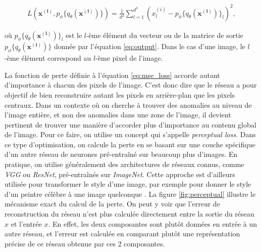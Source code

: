 \begin{gather} \label{eq:mse_loss}
L(\boldsymbol{x^{(i)}}, p_\phi\{q_\theta(\boldsymbol{x^{(i)}})\}) = \frac{1}{d^2} \sum_{l=1}^{d^2} (x^{(i)}_{l} - p_\phi\{q_\theta(\boldsymbol{x^{(i)}})\}_l)^2,
\end{gather}

où $p_\phi\{q_\theta(\boldsymbol{x^{(i)}})\}_l$ est le $l$-ème élément du vecteur ou de la matrice de sortie $p_\phi\{q_\theta(\boldsymbol{x^{(i)}})\}$ donnée par l'équation \ref{eq:output}. Dans le cas d'une image, le $l$-ème élément correspond au $l$-ème  pixel de l'image.

La fonction de perte définie à l'équation \ref{eq:mse_loss} accorde autant d'importance à chacun des pixels de l'image. C'est donc dire que le réseau a pour objectif de bien reconstruire autant les pixels en arrière-plan que les pixels centraux. Dans un contexte où on cherche à trouver des anomalies au niveau de l'image entière, et non des anomalies dans une zone de l'image, il devient pertinent de trouver une manière d'accorder plus d'importance au contenu global de l'image. Pour ce faire, on utilise un concept qui s'appelle \textit{perceptual loss}. Dans ce type d'optimisation, on calcule la perte en se basant sur une couche spécifique d'un autre réseau de neurones pré-entraîné sur beaucoup plus d'images. En pratique, on utilise généralement des architectures de réseaux connus,  comme \textit{VGG} ou \textit{ResNet}, pré-entraînés sur \textit{ImageNet}. Cette approche est d'ailleurs utilisée pour transformer le style d'une image, par exemple pour donner le style d'un peintre célèbre à une image quelconque \citep{Johnson2016Perceptual}. La figure \ref{fig:perceptual} illustre le mécanisme exact du calcul de la perte. On peut y voir que l'erreur de reconstruction du réseau n'est plus calculée directement entre la sortie du réseau $\hat{x}$ et l'entrée $x$. En effet, les deux composantes sont plutôt données en entrée à un autre réseau, et l'erreur est calculée en comparant plutôt une représentation précise de ce réseau obtenue par ces 2 composantes.

